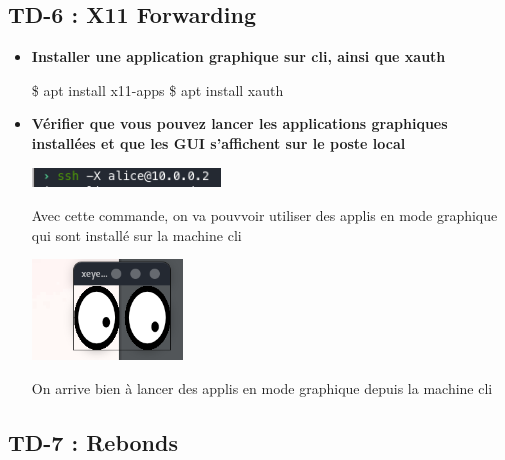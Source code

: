 \documentclass[12pt]{article}
\begin{document}
  \subsection{TD-6 : X11 Forwarding}
  \vspace{0.3cm}

\begin{itemize}
  \item \textbf{Installer une application graphique sur cli, ainsi que xauth}
  \vspace{0.3cm}

  \$ apt install x11-apps \newline
  \$ apt install xauth
\end{itemize}
\vspace{0.3cm}

\begin{itemize}
  \item \textbf{Vérifier que vous pouvez lancer les applications graphiques installées et que les GUI s'affichent
  sur le poste local}
  \vspace{0.3cm}

  \includegraphics[width=5cm]{images/screen-ssh-td6-1.png}
  \vspace{0.3cm}

  Avec cette commande, on va pouvvoir utiliser des applis en mode graphique qui sont installé sur la machine cli
  \vspace{0.3cm}

  \includegraphics[width=4cm]{images/screen-ssh-td6-2.png}
  \vspace{0.3cm}

  On arrive bien à lancer des applis en mode graphique depuis la machine cli
\end{itemize}
\vspace{0.3cm}

  \subsection{TD-7 : Rebonds}
  \vspace{0.3cm}
\end{document}
